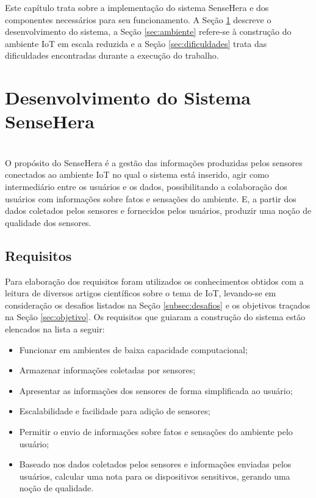 
\quad Este capítulo trata sobre a implementação do sistema SenseHera e dos componentes necessários para seu funcionamento. A Seção \ref{sec:construcao} descreve o desenvolvimento do sistema, a Seção \ref{sec:ambiente} refere-se à construção do ambiente \acrshort{IoT} em escala reduzida e a Seção \ref{sec:dificuldades} trata das dificuldades encontradas durante a execução do trabalho.
\section{Desenvolvimento do Sistema SenseHera}
\label{sec:construcao}
\\\null \quad O propósito do SenseHera é a gestão das informações produzidas pelos sensores conectados ao ambiente \acrshort{IoT} no qual o sistema está inserido, agir como intermediário entre os usuários e os dados, possibilitando a colaboração dos usuários com informações sobre fatos e sensações do ambiente. E, a partir dos dados coletados pelos sensores e fornecidos pelos usuários, produzir uma noção de qualidade dos sensores.

\subsection{Requisitos}
\null \quad Para elaboração dos requisitos foram utilizados os conhecimentos obtidos com a leitura de diversos artigos científicos sobre o tema de \acrlong{IoT}, levando-se em consideração os desafios listados na Seção \ref{subsec:desafios} e os objetivos traçados na Seção \ref{sec:objetivo}. Os requisitos que guiaram a construção do sistema estão elencados na lista a seguir:
\begin{itemize}
  \item Funcionar em ambientes de baixa capacidade computacional;
  \item Armazenar informações coletadas por sensores;
  \item Apresentar as informações dos sensores de forma simplificada ao usuário;
  \item Escalabilidade e facilidade para adição de sensores;
  \item Permitir o envio de informações sobre fatos e sensações do ambiente pelo usuário;
  \item Baseado nos dados coletados pelos sensores e informações enviadas pelos usuários, calcular uma nota para os dispositivos sensitivos, gerando uma noção de qualidade.
\end{itemize}

